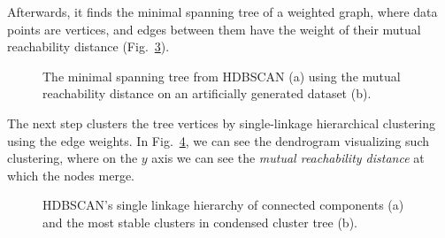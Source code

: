 Afterwards, it finds the minimal spanning tree of a weighted graph, where data points are vertices, and edges between them have the weight of their mutual reachability distance (Fig.~\ref{fig:hdbscan_tree}).
\begin{figure}[h]
     \centering
     \begin{subfigure}[b]{0.495\textwidth}
        \centering
        
        \caption{}
        \label{fig:hdbscan_dataset}
     \end{subfigure}
     \hfill
     \begin{subfigure}[b]{0.495\textwidth}
        \centering
        
        \caption{}
        \label{fig:hdbscan_tree}
     \end{subfigure}
    \caption{The minimal spanning tree from HDBSCAN (a) using the mutual reachability distance on an artificially generated dataset (b).
    }
\end{figure}

The next step clusters the tree vertices by single-linkage hierarchical clustering using the edge weights. In Fig.~\ref{fig:hdbscan_hier}, we can see the dendrogram visualizing such clustering, where on the $y$ axis we can see the \textit{mutual reachability distance} at which the nodes merge.
\begin{figure}[h]
     \centering
     \begin{subfigure}[b]{0.48\textwidth}
        \centering
        
        \caption{}
        \label{fig:hdbscan_hier}
     \end{subfigure}
     \hfill
     \begin{subfigure}[b]{0.48\textwidth}
        \centering
        
        \caption{}
        \label{fig:hdbscan_cons}
     \end{subfigure}
    \caption{HDBSCAN's single linkage hierarchy of connected components (a) and the most stable clusters in condensed cluster tree (b).
    }
\end{figure}

